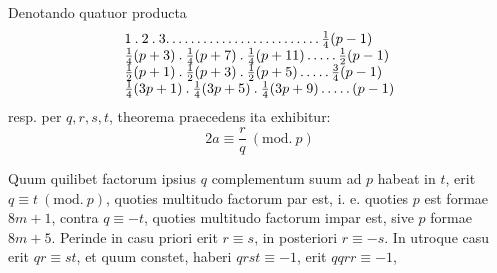 Denotando quatuor producta
\[
\begin{array}{l}
1\mathbin{.}2\mathbin{.}3\mathpunct{.\,.\,.\,.\,.\,.\,.\,.\,.\,.\,.\,.\,.\,.\,.\,.\,.\,.\,.\,.\,.\,.\,.\,.\,.}\frac14(p-1)\\
\frac14(p+3)\mathbin{.}\frac14(p+7)\mathbin{.}\frac14(p+11)\mathinner{.\,.\,.\,.\,.}\frac12(p-1)\\
\frac12(p+1)\mathbin{.}\frac12(p+3)\mathbin{.}\frac12(p+5)\mathinner{.\,.\,.\,.\,.}\frac34(p-1)\\
\frac14(3p+1)\mathbin{.}\frac14(3p+5)\mathbin{.}\frac14(3p+9)\mathinner{.\,.\,.\,.\,.}(p-1)
\end{array}
\]
resp. per $q,r,s,t$, theorema praecedens ita exhibitur:
\[
2a\equiv\frac rq\ (\mathrm{mod.}\ p)
\]

Quum quilibet factorum ipsius $q$ complementum suum ad $p$ habeat in $t$, erit $q\equiv t\ (\mathrm{mod.}\ p)$, quoties multitudo factorum par est, i. e. quoties $p$ est formae $8m+1$, contra $q\equiv-t$, quoties multitudo factorum impar est, sive $p$ formae $8m+5$. Perinde in casu priori erit $r\equiv s$, in posteriori $r\equiv-s$. In utroque casu erit $qr\equiv st$, et quum constet, haberi $qrst\equiv-1$, erit $qqrr\equiv-1$,
